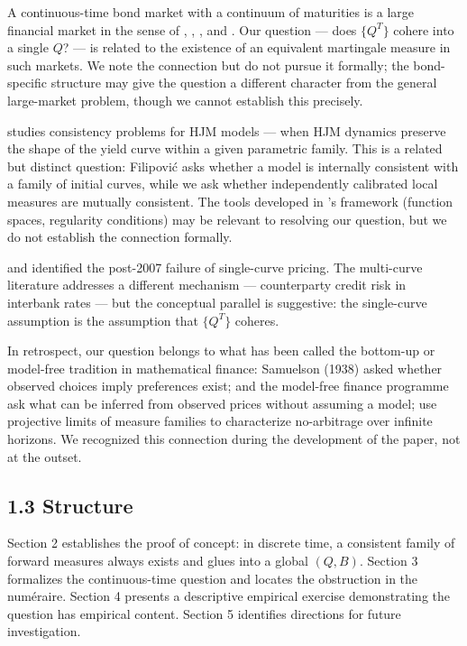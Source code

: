 \documentclass[
]{article}
\begin{document}
A continuous-time bond market with a continuum of maturities is a large
financial market in the sense of \citet{CuchieroKleinTeichmann2016},
\citet{DeDonno2004}, \citet{TakokaSchweizer2014}, and \citet{CarmonaTehranchi2006}. Our question --- does \(\{Q^T\}\) cohere into a single \(Q\)?
--- is related to the existence of an equivalent martingale measure in
such markets. We note the connection but do not pursue it formally; the
bond-specific structure may give the question a different character from
the general large-market problem, though we cannot establish this
precisely.

\citet{Filipovic2001,Filipovic2009} studies consistency problems for HJM models ---
when HJM dynamics preserve the shape of the yield curve within a given
parametric family. This is a related but distinct question: Filipović
asks whether a model is internally consistent with a family of initial
curves, while we ask whether independently calibrated local measures are
mutually consistent. The tools developed in \citeauthor{Filipovic2001}'s framework
(function spaces, regularity conditions) may be relevant to resolving
our question, but we do not establish the connection formally.

\citet{Henrard2007} and \citet{Morini2009} identified the post-2007 failure of
single-curve pricing. The multi-curve literature \citep{FilipovicTrolle2013,Crepey2015,GrbacRunggaldier2015} addresses a
different mechanism --- counterparty credit risk in interbank rates ---
but the conceptual parallel is suggestive: the single-curve assumption
is the assumption that \(\{Q^T\}\) coheres.

In retrospect, our question belongs to what has been called the
bottom-up or model-free tradition in mathematical finance: Samuelson
(1938) asked whether observed choices imply preferences exist; \citet{Hobson1998} and the model-free finance programme \citep{DavisHobson2007,Acciaio2013} ask what can be inferred from observed prices
without assuming a model; \citet{BalbasIbanezLopez2002} use
projective limits of measure families to characterize no-arbitrage over
infinite horizons. We recognized this connection during the development
of the paper, not at the outset.

\subsection{1.3 Structure}\label{structure}

Section 2 establishes the proof of concept: in discrete time, a
consistent family of forward measures always exists and glues into a
global \((Q, B)\). Section 3 formalizes the continuous-time question and
locates the obstruction in the numéraire. Section 4 presents a
descriptive empirical exercise demonstrating the question has empirical
content. Section 5 identifies directions for future investigation.
\end{document}
